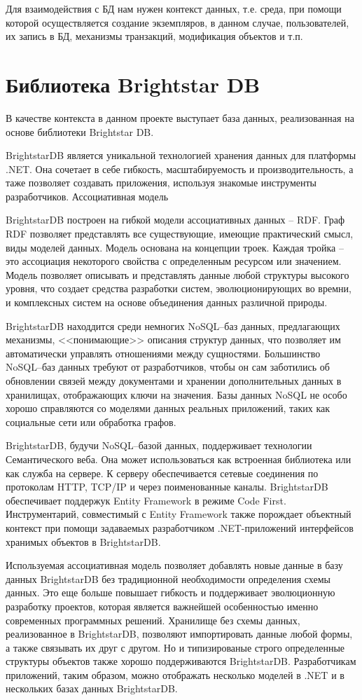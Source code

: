\documentclass[a4paper,14pt,openany,final]{extreport} %
\begin{document}
Для взаимодействия с БД нам нужен контекст данных, т.е. среда, при помощи которой осуществляется создание экземпляров, в данном случае, пользователей, их запись в БД, механизмы транзакций, модификация объектов и т.п.

\section{Библиотека Brightstar DB}
В качестве контекста в данном проекте выступает база данных, реализованная на основе библиотеки Brightstar DB.

BrightstarDB является уникальной технологией хранения данных для платформы .NET. Она сочетает в себе гибкость, масштабируемость и производительность, а таже позволяет создавать приложения, используя знакомые инструменты разработчиков.
Ассоциативная модель

BrightstarDB построен на гибкой модели ассоциативных данных -- RDF. Граф RDF позволяет представлять все существующие, имеющие практический смысл, виды моделей данных. Модель основана на концепции троек. Каждая тройка -- это ассоциация некоторого  свойства с определенным ресурсом или значением. Модель позволяет описывать и представлять данные любой структуры высокого уровня, что создает средства разработки систем, эволюционирующих во времни, и комплексных систем на основе объединения данных различной природы.

BrightstarDB находдится среди немногих NoSQL\;--\;баз данных, предлагающих механизмы, <<понимающие>> описания структур данных, что позволяет им автоматически управлять отношениями между сущностями. Большинство NoSQL\;--\;баз данных требуют от разработчиков, чтобы он сам заботились об обновлении связей между документами и хранении дополнительных данных в хранилищах, отображающих ключи на значения. Базы данных NoSQL не особо хорошо справляются со моделями данных реальных приложений, таких как социальные сети или обработка графов.

BrightstarDB, будучи NoSQL\;--\;базой данных, поддерживает технологии Семантического веба. Она может использоваться как встроенная библиотека или как служба на сервере. К серверу обеспечивается сетевые соединения по протоколам HTTP, TCP/IP и через поименованные каналы. BrightstarDB обеспечивает поддержук Entity Framework в режиме Code First. Инструментарий, совместимый с Entity Framework также порождает объектный контекст при помощи задаваемых разработчиком .NET-приложений интерфейсов хранимых объектов в BrightstarDB.

Используемая ассоциативная модель позволяет добавлять новые данные в базу данных BrightstarDB без традиционной необходимости определения схемы данных. Это еще больше повышает гибкость и поддерживает эволюционную разработку проектов, которая является важнейшей особенностью именно современных программных решений. Хранилище без схемы данных, реализованное в BrightstarDB, позволяют импортировать данные любой формы, а также связывать их друг с другом. Но и типизированые строго определенные структуры объектов также хорошо поддерживаются BrightstarDB. Разработчикам приложений, таким образом, можно отображать несколько моделей в .NET и в нескольких базах данных BrightstarDB.
\end{document}
